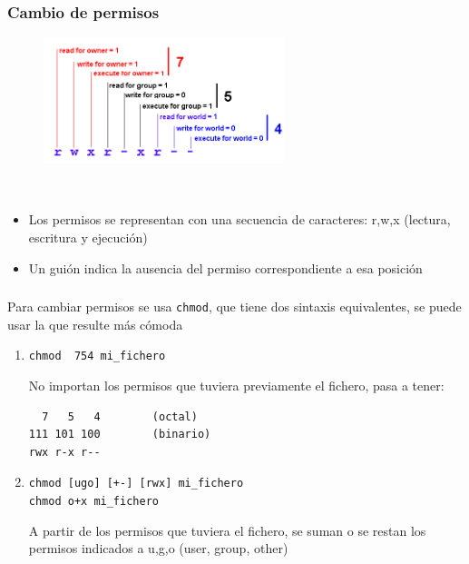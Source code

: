 \documentclass[ucs]{beamer}
\begin{document}






\begin{frame}[fragile]
\frametitle{Cambio de permisos}
\begin{minipage}{7cm}
\begin{figure}
\centerline{\includegraphics[width=7cm]{figs/permission}}
\end{figure}
\end{minipage} \hfill
\

\begin{itemize}
\item
Los permisos se representan con una secuencia de caracteres: r,w,x
(lectura, escritura y ejecución)
\item
Un guión indica la ausencia del permiso correspondiente a esa posición
\end{itemize}
\end{frame}



\begin{frame}[fragile]
\frametitle{}
Para cambiar permisos se usa \verb|chmod|, que tiene dos sintaxis
equivalentes, se puede usar la que resulte más cómoda
\begin{enumerate} 
\item 
\verb|chmod  754 mi_fichero|

No importan los permisos que tuviera previamente el fichero,
pasa a tener:

  \begin{footnotesize}
  \begin{verbatim}
  7   5   4        (octal)
111 101 100        (binario)
rwx r-x r--
  \end{verbatim}
  \end{footnotesize}

\item 
\verb|chmod [ugo] [+-] [rwx] mi_fichero| \\
\verb|chmod o+x mi_fichero|

A partir de los permisos que tuviera el fichero, se suman o
se restan los permisos indicados a u,g,o  (user, group, other)
\end{enumerate}

\end{frame}
\end{document}
